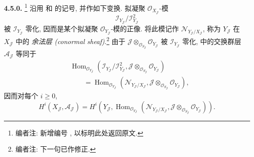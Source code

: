 
\setcounter{footnote}{80}

\medskip
\noindent{}\textbf{4.5.0.}
\footnote{编者注: 新增编号 ,
以标明此处返回原文.}
沿用  和
 的记号, 并作如下变换.
拟凝聚 \(\mathscr O_{X_{\mathscr J}}\)-模
\[
 \mathscr I_{Y_{\mathscr J}}/\mathscr I_{Y_{\mathscr J}}^2
\]
被 \(\mathscr I_{Y_{\mathscr J}}\) 零化,
因而是某个拟凝聚 \(\mathscr O_{Y_{\mathscr J}}\)-模的正像.
将此模记作 \(\mathscr N_{Y_{\mathscr J}/X_{\mathscr J}}\),
称为 \(Y_{\mathscr J}\) 在 \(X_{\mathscr J}\) 中的
\emph{余法层 (conormal sheaf)}.\footnote{编者注: 下一句已作修正.}
由于 \(\mathscr J\otimes_{\mathscr O_{S_{\mathscr J}}}
\mathscr O_{Y_{\mathscr J}}\) 被 \(\mathscr I_{Y_{\mathscr J}}\) 零化,
 中的交换群层
\(\mathscr A_{\mathscr J}\) 等同于
\[
 \begin{split}
 &\operatorname{Hom}_{\mathscr O_{Y_{\mathscr J}}}
 \left(
  \mathscr I_{Y_{\mathscr J}}/\mathscr I_{Y_{\mathscr J}}^2,
  \mathscr J\otimes_{\mathscr O_{S_{\mathscr J}}}
   \mathscr O_{Y_{\mathscr J}}
 \right) \\
 &\qquad={}
 \operatorname{Hom}_{\mathscr O_{Y_{\mathscr J}}}
 \left(
  \mathscr N_{Y_{\mathscr J}/X_{\mathscr J}},
  \mathscr J\otimes_{\mathscr O_{S_{\mathscr J}}}
   \mathscr O_{Y_{\mathscr J}}
 \right),
 \end{split}
\]
因而对每个 \(i\geq0\),
\[
 H^i(X_{\mathscr J},\mathscr A_{\mathscr J})
 =H^i\!\left(
  Y_{\mathscr J},
  \operatorname{Hom}_{\mathscr O_{Y_{\mathscr J}}}
  \left(
   \mathscr N_{Y_{\mathscr J}/X_{\mathscr J}},
   \mathscr J\otimes_{\mathscr O_{S_{\mathscr J}}}
    \mathscr O_{Y_{\mathscr J}}
  \right)
 \right).
\]

